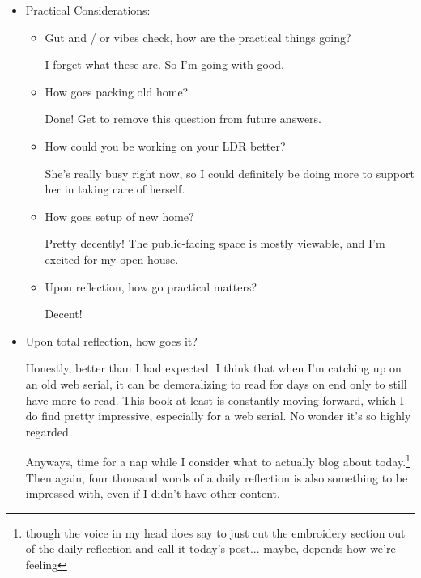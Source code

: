 \documentclass[12pt]{article}
\renewcommand{\,}{\textsuperscript{,}}
\begin{document}
\begin{itemize}
\begin{itemize}
\item Water?

Not really where I want to be in general. Still, drinking more than before and it's always a game of progress.

\item Sleep?

I was having some insomnia, so tried a lil bit of sleep modulation. I think that the insomnia was an acute thing from an infection, and the need for more sleep is actually the chronic bit. Once I finish this reflection, gonna go take a nap.

\item Upon reflection, how is it going?

Eh! Could be doing better, could be doing worse.

\end{itemize}

\item Practical Considerations:

\begin{itemize}

\item Gut and / or vibes check, how are the practical things going?

I forget what these are. So I'm going with good.


\item How goes packing old home?

Done! Get to remove this question from future answers.


\item How could you be working on your LDR better?

She's really busy right now, so I could definitely be doing more to support her in taking care of herself.

\item How goes setup of new home?

Pretty decently! The public-facing space is mostly viewable, and I'm excited for my open house.

\item Upon reflection, how go practical matters?

Decent!

\end{itemize}

\item Upon total reflection, how goes it?

Honestly, better than I had expected.
I think that when I'm catching up on an old web serial, it can be demoralizing to read for days on end only to still have more to read.
This book at least is constantly moving forward, which I do find pretty impressive, especially for a web serial.
No wonder it's so highly regarded.

Anyways, time for a nap while I consider what to actually blog about today.\footnote{though the voice in my head does say to just cut the embroidery section out of the daily reflection and call it today's post... maybe, depends how we're feeling}
Then again, four thousand words of a daily reflection is also something to be impressed with, even if I didn't have other content.

\end{itemize}
\end{document}
